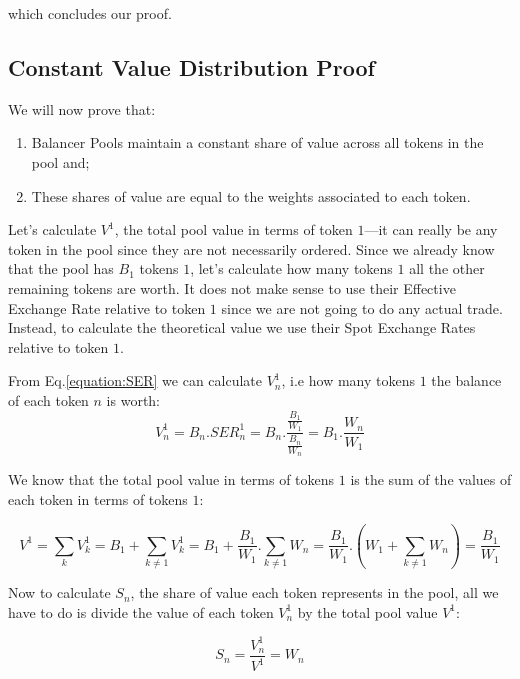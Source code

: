 \documentclass[11pt]{amsart}
\begin{document}
which concludes our proof.

\subsection{Constant Value Distribution Proof}
\label{section:proof_constant_value_distribution}
We will now prove that:
\begin{enumerate}
    \item Balancer Pools maintain a constant share of value across all tokens in the pool and;
    \item These shares of value are equal to the weights associated to each token.
\end{enumerate}

Let's calculate $V^1$, the total pool value in terms of token $1$---it can really be any token in the pool since they are not necessarily ordered. Since we already know that the pool has $B_1$ tokens $1$, let's calculate how many tokens $1$ all the other remaining tokens are worth. It does not make sense to use their Effective Exchange Rate relative to token $1$ since we are not going to do any actual trade. Instead, to calculate the theoretical value we use their Spot Exchange Rates relative to token $1$.

From Eq.\ref{equation:SER} we can calculate $V^1_n$, i.e how many tokens $1$ the balance of each token $n$ is worth:
\begin{equation}
\label{equation:value_i_tokens1}
V^1_n = B_{n} . SER^{1}_{n} = B_{n} . \frac{\frac{B_{1}}{W_{1}}}{\frac{B_{n}}{W_{n}}} =
B_{1}.\frac{W_{n}}{W_{1}}
\end{equation}

We know that the total pool value in terms of tokens $1$ is the sum of the values of each token in terms of tokens $1$:

\begin{equation}
\label{equation:total_value_i_tokens1}
V^1 = \sum_{k}V^1_k = B_{1} +\sum_{k\neq 1}V^1_k =
B_{1} + \frac{B_{1}}{W_{1}}.\sum_{k\neq 1}W_n =
\frac{B_{1}}{W_{1}}.(W_1+\sum_{k\neq 1}W_n) = \frac{B_{1}}{W_{1}}
\end{equation}

Now to calculate $S_n$, the share of value each token represents in the pool, all we have to do is divide the value of each token $V^1_n$ by the total pool value $V^1$:

\begin{equation}
\label{equation:total_value_i_tokens1}
S_n = \frac{V^1_n}{V^1} = W_n
\end{equation}
\end{document}
